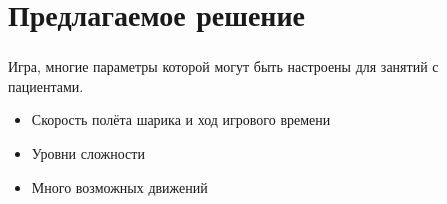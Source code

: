 \section{Предлагаемое решение}

\begin{frame}
\frametitle{\insertsection} 
\framesubtitle{\insertsubsection}
    Игра, многие параметры которой могут быть настроены для занятий с пациентами.
    \begin{itemize}
        \item Скорость полёта шарика и ход игрового времени
        \item Уровни сложности
        \item Много возможных движений
    \end{itemize}
\end{frame}